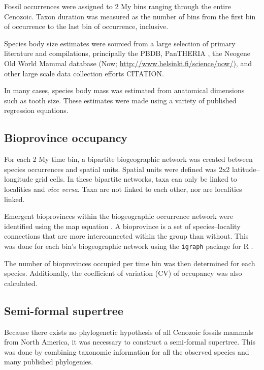 \documentclass[12pt,letterpaper]{article}
\begin{document}
Fossil occurrences were assigned to 2 My bins ranging through the entire Cenozoic. Taxon duration was measured as the number of bins from the first bin of occurrence to the last bin of occurrence, inclusive.

Species body size estimates were sourced from a large selection of primary literature and compilations, principally the PBDB, PanTHERIA \citep{Jones2009c}, the Neogene Old World Mammal database (Now; \url{http://www.helsinki.fi/science/now/}), and other large scale data collection efforts \citep{Smith2004c, Raia2012f, Brook2004a, Freudenthal2013, McKenna2011} CITATION. %

In many cases, species body mass was estimated from anatomical dimensions such as tooth size. These estimates were made using a variety of published regression equations. %


\subsection{Bioprovince occupancy}

For each 2 My time bin, a bipartite biogeographic network was created between species occurrences and spatial units. Spatial units were defined was 2x2 latitude--longitude grid cells. In these bipartite networks, taxa can only be linked to localities and \textit{vice versa}. Taxa are not linked to each other, nor are localities linked. 

Emergent bioprovinces within the biogeographic occurrence network were identified using the map equation \citep{Rosvall2008,Rosvall2009a}. A bioprovince is a set of species--locality connections that are more interconnected within the group than without. This was done for each bin's biogeographic network using the \texttt{igraph} package for R \citep{csardi2006igraph,2014language}. 

The number of bioprovinces occupied per time bin was then determined for each species. Additionally, the coefficient of variation (CV) of occupancy was also calculated.


\subsection{Semi-formal supertree}

Because there exists no phylogenetic hypothesis of all Cenozoic fossils mammals from North America, it was necessary to construct a semi-formal supertree. This was done by combining taxonomic information for all the observed species and many published phylogenies.
\end{document}
